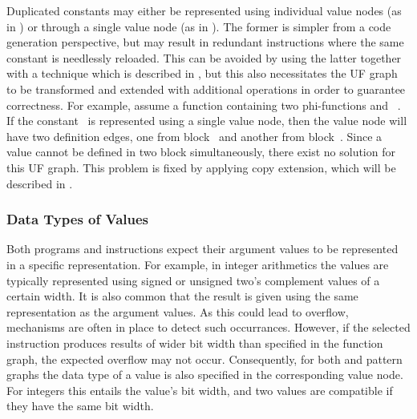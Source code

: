 Duplicated constants may either be represented using individual \glspl{value
  node} (as in ) or through a single
\gls{value node} (as in ).
%
The former is simpler from a \gls{code generation} perspective, but may result
in redundant \glspl{instruction} where the same constant is needlessly reloaded.
%
This can be avoided by using the latter together with a technique which is
described in , but this also necessitates the
\gls{UF graph} to be transformed and extended with additional \glspl{operation}
in order to guarantee correctness.
%
For example, assume a \gls{function} containing two \glspl{phi-function}
\mbox{\irFont {}} and \mbox{\irFont
  }.
%
If the constant~ is represented using a single \gls{value node}, then
the \gls{value node} will have two \glspl{definition edge}, one from
\gls{block}~ and another from \gls{block}~.
%
Since a value cannot be defined in two \gls{block} simultaneously, there exist
no \gls{solution} for this \gls{UF graph}.
%
This problem is fixed by applying \gls{copy extension}, which will be described
in .



\subsubsection{Data Types of Values}

Both \glspl{program} and \glspl{instruction} expect their argument values to be
represented in a specific representation.
%
For example, in integer arithmetics the values are typically represented using
signed or unsigned two's complement values of a certain width.
%
It is also common that the result is given using the same representation as the
argument values.
%
As this could lead to overflow, mechanisms are often in place to detect such
occurrances.
%
However, if the selected \gls{instruction} produces results of wider bit width
than specified in the \gls{function graph}, the expected overflow may not occur.
%
Consequently, for both  and \glspl{pattern graph} the
data type of a value is also specified in the corresponding \gls{value node}.
%
For integers this entails the value's bit width, and two values are compatible
if they have the same bit width.



